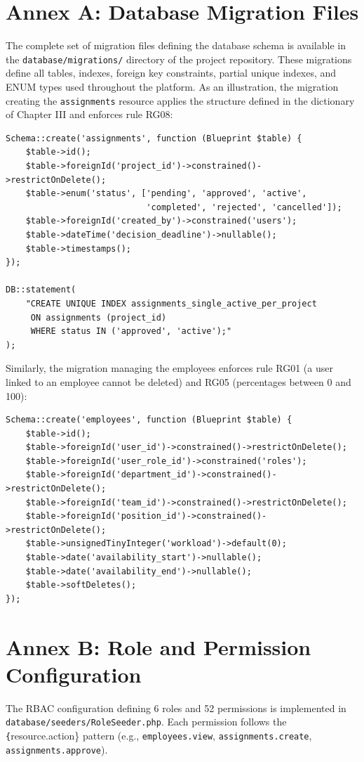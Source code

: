 \documentclass{bts-report}
\begin{document}
\section*{Annex A: Database Migration Files}
The complete set of migration files defining the database schema is available in the \texttt{database/migrations/} directory of the project repository. These migrations define all tables, indexes, foreign key constraints, partial unique indexes, and ENUM types used throughout the platform. As an illustration, the migration creating the \texttt{assignments} resource applies the structure defined in the dictionary of Chapter III and enforces rule RG08:

\begin{verbatim}
Schema::create('assignments', function (Blueprint $table) {
    $table->id();
    $table->foreignId('project_id')->constrained()->restrictOnDelete();
    $table->enum('status', ['pending', 'approved', 'active',
                            'completed', 'rejected', 'cancelled']);
    $table->foreignId('created_by')->constrained('users');
    $table->dateTime('decision_deadline')->nullable();
    $table->timestamps();
});

DB::statement(
    "CREATE UNIQUE INDEX assignments_single_active_per_project
     ON assignments (project_id)
     WHERE status IN ('approved', 'active');"
);
\end{verbatim}

Similarly, the migration managing the employees enforces rule RG01 (a user linked to an employee cannot be deleted) and RG05 (percentages between 0 and 100):

\begin{verbatim}
Schema::create('employees', function (Blueprint $table) {
    $table->id();
    $table->foreignId('user_id')->constrained()->restrictOnDelete();
    $table->foreignId('user_role_id')->constrained('roles');
    $table->foreignId('department_id')->constrained()->restrictOnDelete();
    $table->foreignId('team_id')->constrained()->restrictOnDelete();
    $table->foreignId('position_id')->constrained()->restrictOnDelete();
    $table->unsignedTinyInteger('workload')->default(0);
    $table->date('availability_start')->nullable();
    $table->date('availability_end')->nullable();
    $table->softDeletes();
});
\end{verbatim}

\section*{Annex B: Role and Permission Configuration}
The RBAC configuration defining 6 roles and 52 permissions is implemented in \texttt{database/seeders/RoleSeeder.php}. Each permission follows the \texttt\{{resource}.{action}\} pattern (e.g., \texttt{employees.view}, \texttt{assignments.create}, \texttt{assignments.approve}).
\end{document}
